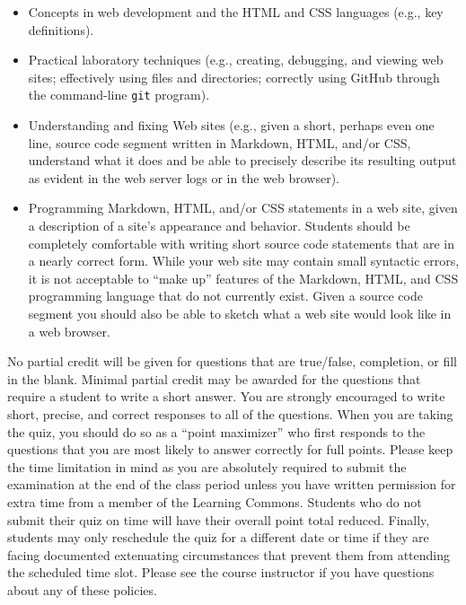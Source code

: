 \documentclass[11pt]{article}
\begin{document}
\vspace*{-.05in}
\begin{itemize}

  \itemsep 0in

  \item Concepts in web development and the HTML and CSS languages (e.g., key
    definitions).

  \item Practical laboratory techniques (e.g., creating, debugging, and viewing
    web sites; effectively using files and directories; correctly using GitHub
    through the command-line {\tt git} program).

  \item Understanding and fixing Web sites (e.g., given a short, perhaps even
    one line, source code segment written in Markdown, HTML, and/or CSS,
    understand what it does and be able to precisely describe its resulting
    output as evident in the web server logs or in the web browser).

  \item Programming Markdown, HTML, and/or CSS statements in a web site, given a
    description of a site's appearance and behavior. Students should be
    completely comfortable with writing short source code statements that are in
    a nearly correct form. While your web site may contain small syntactic
    errors, it is not acceptable to ``make up'' features of the Markdown, HTML,
    and CSS programming language that do not currently exist. Given a source
    code segment you should also be able to sketch what a web site would look
    like in a web browser.

\end{itemize}

\noindent No partial credit will be given for questions that are true/false,
completion, or fill in the blank. Minimal partial credit may be awarded for the
questions that require a student to write a short answer. You are strongly
encouraged to write short, precise, and correct responses to all of the
questions. When you are taking the quiz, you should do so as a ``point
maximizer'' who first responds to the questions that you are most likely to
answer correctly for full points. Please keep the time limitation in mind as you
are absolutely required to submit the examination at the end of the class period
unless you have written permission for extra time from a member of the Learning
Commons. Students who do not submit their quiz on time will have their overall
point total reduced. Finally, students may only reschedule the quiz for a
different date or time if they are facing documented extenuating circumstances
that prevent them from attending the scheduled time slot. Please see the course
instructor if you have questions about any of these policies.
\end{document}
